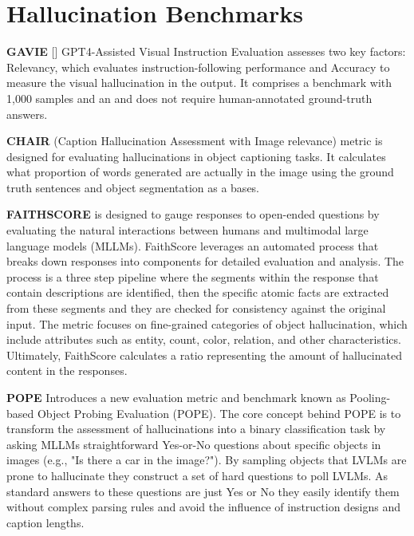 \documentclass[twocolumn, 9pt]{extarticle}
\begin{document}
\section{Hallucination Benchmarks}
\textbf{GAVIE } []
GPT4-Assisted Visual Instruction Evaluation assesses two key factors: Relevancy, which evaluates instruction-following performance and Accuracy to measure the visual hallucination in the output. It comprises a benchmark with 1,000 samples and an and does not require human-annotated ground-truth answers. 

\textbf{CHAIR} 
 (Caption Hallucination Assessment with Image relevance) metric is designed for evaluating hallucinations in object captioning tasks. It calculates what proportion of words generated are actually in the image using the ground truth sentences and object segmentation as a bases. 

\textbf{FAITHSCORE} 
is designed to gauge responses to open-ended questions by evaluating the natural interactions between humans and multimodal large language models (MLLMs). FaithScore leverages an automated process that breaks down responses into components for detailed evaluation and analysis. The process is a three step pipeline where the segments within the response that contain descriptions are identified, then the specific atomic facts are extracted from these segments and they are checked for consistency against the original input. The  metric focuses on fine-grained categories of object hallucination, which include attributes such as entity, count, color, relation, and other characteristics. Ultimately, FaithScore calculates a ratio representing the amount of hallucinated content in the responses.

\textbf{POPE} 
Introduces a new evaluation metric and benchmark known as Pooling-based Object Probing Evaluation (POPE). The core concept behind POPE is to transform the assessment of hallucinations into a binary classification task by asking MLLMs straightforward Yes-or-No questions about specific objects in images (e.g., "Is there a car in the image?"). By sampling objects that LVLMs are prone to hallucinate they construct a set of hard questions to poll LVLMs. As standard answers to these questions are just Yes or No they easily identify them without complex parsing rules and avoid the influence of instruction designs and caption lengths. 
\end{document}
